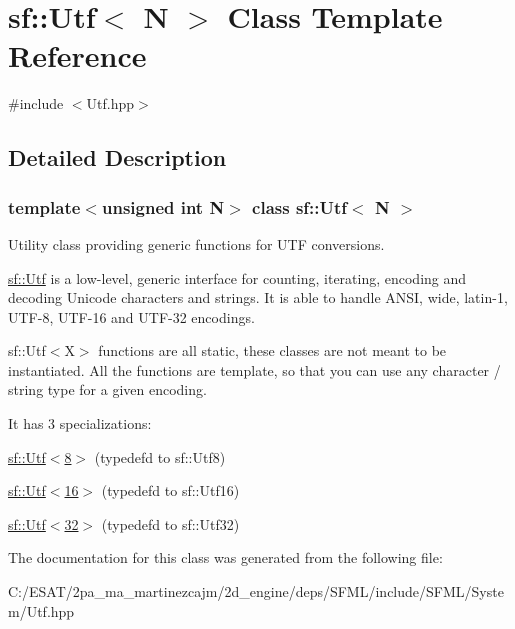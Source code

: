 \hypertarget{classsf_1_1_utf}{}\section{sf\+:\+:Utf$<$ N $>$ Class Template Reference}
\label{classsf_1_1_utf}


{\ttfamily \#include $<$Utf.\+hpp$>$}



\subsection{Detailed Description}
\subsubsection*{template$<$unsigned int N$>$\newline
class sf\+::\+Utf$<$ N $>$}

Utility class providing generic functions for U\+TF conversions.

\hyperlink{classsf_1_1_utf}{sf\+::\+Utf} is a low-\/level, generic interface for counting, iterating, encoding and decoding Unicode characters and strings. It is able to handle A\+N\+SI, wide, latin-\/1, U\+T\+F-\/8, U\+T\+F-\/16 and U\+T\+F-\/32 encodings.

sf\+::\+Utf$<$\+X$>$ functions are all static, these classes are not meant to be instantiated. All the functions are template, so that you can use any character / string type for a given encoding.

It has 3 specializations\+: \begin{DoxyItemize}
\item \hyperlink{classsf_1_1_utf_3_018_01_4}{sf\+::\+Utf$<$8$>$} (typedef\textquotesingle{}d to sf\+::\+Utf8) \item \hyperlink{classsf_1_1_utf_3_0116_01_4}{sf\+::\+Utf$<$16$>$} (typedef\textquotesingle{}d to sf\+::\+Utf16) \item \hyperlink{classsf_1_1_utf_3_0132_01_4}{sf\+::\+Utf$<$32$>$} (typedef\textquotesingle{}d to sf\+::\+Utf32) \end{DoxyItemize}


The documentation for this class was generated from the following file\+:\begin{DoxyCompactItemize}
\item 
C\+:/\+E\+S\+A\+T/2pa\+\_\+ma\+\_\+martinezcajm/2d\+\_\+engine/deps/\+S\+F\+M\+L/include/\+S\+F\+M\+L/\+System/Utf.\+hpp\end{DoxyCompactItemize}
